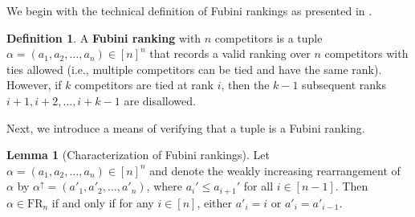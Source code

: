 \documentclass{amsart}
\newcommand{\defterm}{\textbf}
\theoremstyle{definition}
\newtheorem{lemma}{Lemma}[section]
\theoremstyle{definition}
\newtheorem{definition}{Definition}[section]
\theoremstyle{remark}
\newcommand{\FR}[1]{\mathrm{FR}_{#1}}
\begin{document}
We begin with the technical definition of Fubini rankings as presented in \cite[Definition 2.4]{weak}.

\begin{definition}\label{def:Fubini rankings}
    A \defterm{Fubini ranking} with $n$ competitors is a tuple $\alpha=(a_1,a_2,\ldots,a_n)\in [n]^n$ that records a valid ranking over $n$ competitors with ties allowed (i.e., multiple competitors can be tied and have the same rank).
    However, if $k$ competitors are tied at rank $i$, then the $k-1$ subsequent ranks $i + 1, i + 2, \ldots, i + k - 1$ are disallowed.
\end{definition}


Next, we introduce a means of verifying that a tuple is a Fubini ranking. 
\begin{lemma}[Characterization of Fubini rankings]\label{lemma: weakly increasing Fubini proof}
    Let $\alpha=(a_1,a_2,\ldots, a_n)\in[n]^n$ 
    and denote the weakly increasing rearrangement of $\alpha$ by $\alpha^\uparrow=(a'_1,a'_2,\ldots, a'_n)$, where $a_i'\leq a_{i+1}'$ for all $i\in[n-1]$. 
    Then $\alpha\in \FR{n}$ if and only if  for any $i\in [n]$, 
    either $a'_i=i$ or $a'_i=a'_{i-1}$. 
\end{lemma}
\end{document}
